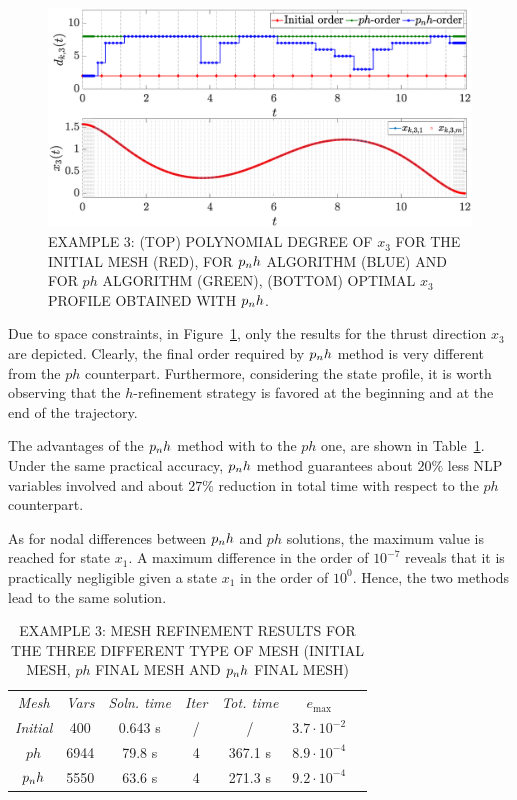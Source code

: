 \begin{figure}[t]
	\centering
	\includegraphics[trim={1cm 0.1cm 2cm 1.05cm},clip,width=1.\linewidth]{Img/pnh1_free}
	\caption{EXAMPLE 3: (TOP) POLYNOMIAL DEGREE OF $x_{3}$ FOR THE INITIAL MESH (RED), FOR $p_{n}h$ ALGORITHM (BLUE) AND FOR $ph$ ALGORITHM (GREEN), (BOTTOM) OPTIMAL $x_3$ PROFILE OBTAINED WITH $p_{n}h$.}
	\label{fig:pnh1free}
\end{figure}

Due to space constraints, in Figure~\ref{fig:pnh1free}, only the results for the thrust direction $x_3$ are depicted. Clearly, the final order required by $p_{n}h$ method is very different from the $ph$ counterpart. Furthermore, considering the state profile, it is worth observing that the $h$-refinement strategy is favored at the beginning and at the end of the trajectory.

The advantages of the $p_{n}h$ method with to the $ph$ one, are shown in Table~\ref{tab:tablefree}. Under the same practical accuracy, $p_{n}h$ method guarantees about $20\%$ less NLP variables involved and about $27\%$ reduction in total time with respect to the $ph$ counterpart.

As for nodal differences between $p_{n}h$ and $ph$ solutions, the maximum value is reached for state $x_1$. A maximum difference in the order of $10^{-7}$ reveals that it is practically negligible given a state $x_1$ in the order of $10^0$. Hence, the two methods lead to the same solution.
\begin{table}[t]
	\caption{EXAMPLE 3: MESH REFINEMENT RESULTS FOR THE THREE DIFFERENT TYPE OF MESH (INITIAL MESH, $ph$ FINAL MESH AND $p_{n}h$ FINAL MESH)}
	\begin{center}
		\label{tab:tablefree}
		\begin{tabular}{c c c c c c c}
			& & \\ %
			\hline
			\emph{Mesh} & \emph{Vars} & \emph{Soln. time} & \emph{Iter} & \emph{Tot. time} & $e_\text{max}$ \\
			\hline
			\emph{Initial} & 400 & 0.643 s & / & / &  $3.7 \cdot 10^{-2}$\\
			$ph$  & 6944 & 79.8 s & 4 & 367.1 s & $8.9\cdot 10^{-4}$ \\
			$p_{n}h$ & 5550 & 63.6 s & 4 & 271.3 s & $9.2\cdot 10^{-4}$ \\
			\hline
		\end{tabular}
	\end{center}
\end{table}


